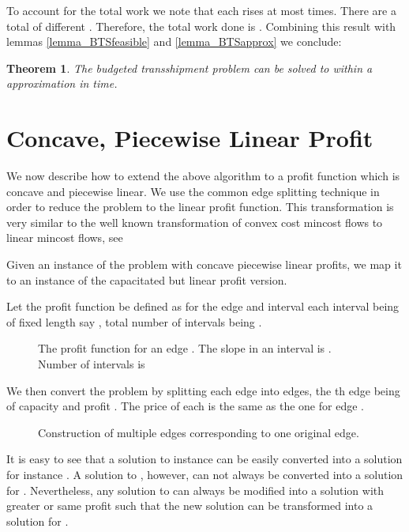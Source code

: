 \documentclass[11pt]{article}
\newtheorem{theorem}{Theorem}[section]
\newcounter{rem}
\begin{document}
{To account for the total work we note that each  rises at most 
 times. There are a total of  different .
Therefore, the total work done is .
Combining this result with lemmas \ref{lemma_BTSfeasible} and \ref{lemma_BTSapprox} 
we conclude:


\begin{theorem}

The budgeted transshipment problem can be solved to within a  
approximation in  time.

\label{theorem_BTScomp}

\end{theorem}
}

\section{Concave, Piecewise Linear Profit}
\label{piece-wise}

We now describe how to extend the above algorithm to a profit function which 
is concave and piecewise linear. We use the common edge splitting technique 
in order to reduce the problem to the linear profit function. This transformation
is very similar to the well known transformation of convex cost mincost flows to
linear mincost flows, see \cite{ahuja}

Given an instance  of the problem with concave piecewise linear profits,
we map it to an instance  of the capacitated but linear profit version.

Let the profit function be defined as  for the edge  and interval
 each interval being of fixed length say , total number of intervals 
being . 

\begin{figure}[h]
\centerline{\epsfysize=170pt}
\caption{The profit function for an edge . The slope in an interval  is . Number
of intervals is }
\end{figure}

We then convert the problem by  splitting each edge into  edges, the
th edge being  of capacity
 and profit . The price of each is the same as the one for edge . 

\begin{figure}[h]
\centerline{\epsfysize=180pt}
\caption{Construction of multiple edges corresponding to one original edge.}
\end{figure}

It is easy to see that a solution to instance  can be easily converted into a solution for
instance . A solution to , however, can not always be converted into a 
solution for . Nevertheless, any solution to  can always be modified into 
a solution with greater or same profit such that the new solution 
can be transformed into a solution for . 
\end{document}
